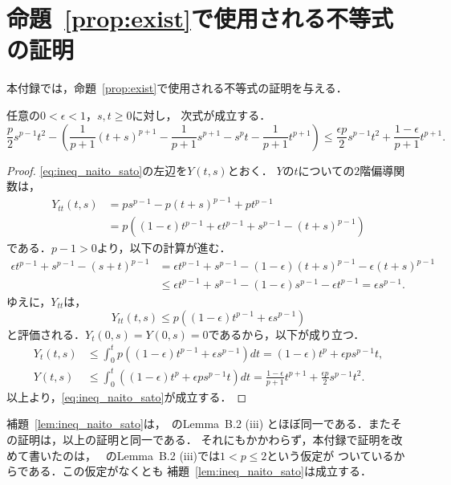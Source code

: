 
\section{命題~\ref{prop:exist}で使用される不等式の証明}
\label{sec:lem_naito_sato} 

本付録では，命題~\ref{prop:exist}で使用される不等式の証明を与える．

\begin{lem} \label{lem:ineq_naito_sato}
 任意の$0 < \epsilon < 1$，$s, t \geq 0$に対し，
 次式が成立する．
 \begin{equation}
  \frac{p}{2}s^{p-1}t^2 - 
   \left( \frac{1}{p+1}(t+s)^{p+1} -
    \frac{1}{p+1}s^{p+1} - s^pt - \frac{1}{p+1}t^{p+1}
   \right) \leq \frac{\epsilon p}{2} s^{p-1}
   t^2 + \frac{1-\epsilon}{p+1} t^{p+1}. \label{eq:ineq_naito_sato}
 \end{equation}
\end{lem}
 
\begin{proof}
 \eqref{eq:ineq_naito_sato}の左辺を$Y(t, s)$とおく．
 $Y$の$t$についての$2$階偏導関数は，
 \begin{align*}
  Y_{tt}(t, s) &= p s^{p-1} - p(t+s)^{p-1} + pt^{p-1} \\
  &= p \left( (1- \epsilon) t^{p-1} + \epsilon t^{p-1} + s^{p-1} -
  (t+s)^{p-1} \right)
 \end{align*}
 である．$p - 1 > 0$より，以下の計算が進む．
 \begin{align*}
  \epsilon t^{p-1} + s^{p-1} - (s+t)^{p-1} &= 
  \epsilon t^{p-1} + s^{p-1} - (1-\epsilon)(t+s)^{p-1} - \epsilon
  (t+s)^{p-1} \\
  & \leq \epsilon t^{p-1} + s^{p-1} - (1-\epsilon) s^{p-1} - \epsilon
  t^{p-1} = \epsilon s^{p-1}.
 \end{align*}
 ゆえに，$Y_{tt}$は，
 \[
  Y_{tt}(t, s) \leq p \left( (1-\epsilon) t^{p-1} + \epsilon s^{p-1} \right)
 \]
 と評価される．$Y_t(0, s) = Y(0, s) = 0$であるから，以下が成り立つ．
 \begin{align*}
  Y_t(t, s) &\leq \int_0^t  p \left( (1-\epsilon) t^{p-1} + \epsilon
  s^{p-1} \right) dt = (1 - \epsilon) t^p + \epsilon p s^{p-1} t, \\
  Y(t, s) &\leq \int_0^t \left( (1 - \epsilon) t^p + \epsilon p
  s^{p-1} t \right)dt = \frac{1 -\epsilon}{p+1} t^{p+1} +
  \frac{\epsilon p}{2}s^{p-1}t^2.
 \end{align*}
 以上より，\eqref{eq:ineq_naito_sato}が成立する．\qedhere
\end{proof}

補題~\ref{lem:ineq_naito_sato}は，\cite{MR2886160}~のLemma~B.2 (iii)
とほぼ同一である．またその証明は，以上の証明と同一である．
それにもかかわらず，本付録で証明を改めて書いたのは，
\cite{MR2886160}~のLemma~B.2 (iii)では$1 < p \leq 2$という仮定が
ついているからである．この仮定がなくとも
補題~\ref{lem:ineq_naito_sato}は成立する．

